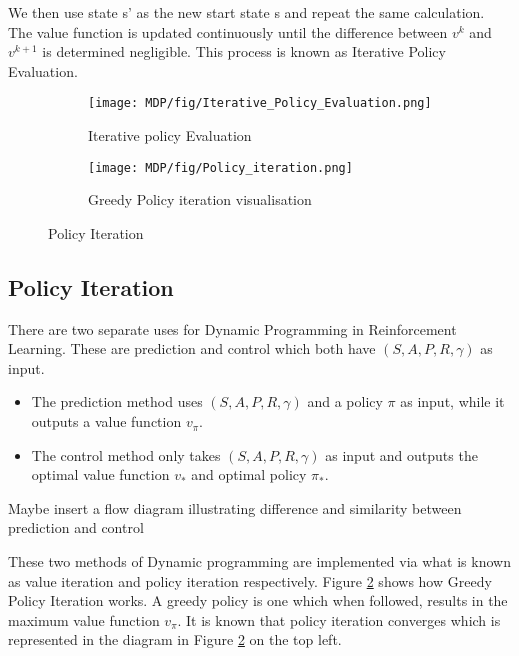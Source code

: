 We then use state s' as the new start state s and repeat the same calculation.
The value function is updated continuously until the difference between $v^{k}$ and $v^{k+1}$ is determined negligible. This process is known as Iterative Policy Evaluation.

\begin{figure}
	\centering
	\begin{subfigure}{.49\textwidth}
		\centering
		\texttt{[image: MDP/fig/Iterative\_Policy\_Evaluation.png]}
		\caption{Iterative policy Evaluation\cite{David_Silver}}
		\label{fig:iterative_policy_evaluation}
	\end{subfigure}
	\begin{subfigure}{.49\textwidth}
		\centering
		\texttt{[image: MDP/fig/Policy\_iteration.png]}
		\caption{Greedy Policy iteration visualisation\cite{David_Silver}}
		\label{fig:greedy_policy_iteration}
	\end{subfigure}
	\caption{Policy Iteration \cite{David_Silver}}
	\label{fig:policy_iteration}
\end{figure}

\subsection{Policy Iteration}
There are two separate uses for Dynamic Programming in Reinforcement Learning. These are prediction and control which both have $(S,A,P,R,\gamma)$ as input.
\begin{itemize}
	\item The prediction method uses $(S,A,P,R,\gamma)$ and a policy $\pi$ as input, while it outputs a value function $v_\pi$.
	\item The control method only takes $(S,A,P,R,\gamma)$ as input and outputs the optimal value function $v_*$ and optimal policy $\pi_{*}$.
\end{itemize}
{\color{red} Maybe insert a flow diagram illustrating difference and similarity between prediction and control }

These two methods of Dynamic programming are implemented via what is known as value iteration and policy iteration respectively.
Figure \ref{fig:greedy_policy_iteration} shows how Greedy Policy Iteration works. A greedy policy is one which when followed, results in the maximum value function $v_\pi$. It is known that policy iteration converges which is represented in the diagram in Figure \ref{fig:greedy_policy_iteration} on the top left.\cite{sutton_barto}

